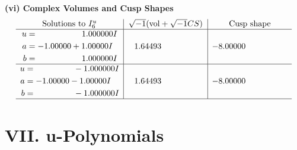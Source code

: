 \documentclass[1p]{elsarticle_modified}
\theoremstyle{definition}
\newcommand{\I}{\sqrt{-1}}
\begin{document}
\newpage\flushleft \textbf{(vi) Complex Volumes and Cusp Shapes}
$$\begin{array}{c|c|c}  
\text{Solutions to }I^u_{6}& \I (\text{vol} + \sqrt{-1}CS) & \text{Cusp shape}\\
 \hline 
\begin{aligned}
u &= \phantom{-0.000000 -}1.000000 I \\
a &= -1.00000 + 1.00000 I \\
b &= \phantom{-0.000000 -}1.000000 I\end{aligned}
 & \phantom{-}1.64493\phantom{ +0.000000I} & -8.00000\phantom{ +0.000000I} \\ \hline\begin{aligned}
u &= \phantom{-0.000000 } -1.000000 I \\
a &= -1.00000 - 1.00000 I \\
b &= \phantom{-0.000000 } -1.000000 I\end{aligned}
 & \phantom{-}1.64493\phantom{ +0.000000I} & -8.00000\phantom{ +0.000000I}\\
 \hline 
 \end{array}$$\newpage
\newpage\renewcommand{\arraystretch}{1}
\centering \section*{ VII. u-Polynomials}
\end{document}
